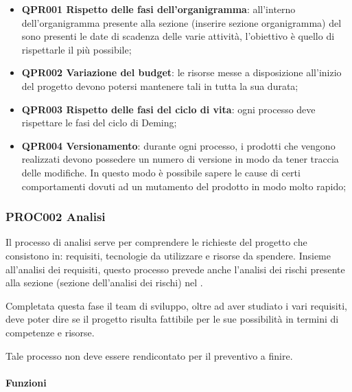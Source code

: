 		\begin{itemize}
			\item \textbf{QPR001 Rispetto delle fasi dell'organigramma}: all'interno dell'organigramma presente alla sezione (inserire sezione organigramma) del \Doc{\PdP} sono presenti le date di scadenza delle varie attività, l'obiettivo è quello di rispettarle il più possibile;
			\item \textbf{QPR002 Variazione del budget}: le risorse messe a disposizione all'inizio del progetto devono potersi mantenere tali in tutta la sua durata;
			\item \textbf{QPR003 Rispetto delle fasi del ciclo di vita}: ogni processo deve rispettare le fasi del ciclo di Deming;
			\item \textbf{QPR004 Versionamento}: durante ogni processo, i prodotti che vengono realizzati devono possedere un numero di versione in modo da tener traccia delle modifiche. In questo modo è possibile sapere le cause di certi comportamenti dovuti ad un mutamento del prodotto in modo molto rapido;  
		\end{itemize}
	
	\subsubsection{PROC002 Analisi}
	Il processo di analisi serve per comprendere le richieste del progetto che consistono in: requisiti, tecnologie da utilizzare e risorse da spendere. Insieme all'analisi dei requisiti, questo processo prevede anche l'analisi dei rischi presente alla sezione (sezione dell'analisi dei rischi) nel \Doc{\PdP}.
	
	Completata questa fase il team di sviluppo, oltre ad aver studiato i vari requisiti, deve poter dire se il progetto risulta fattibile per le sue possibilità in termini di competenze e risorse.
	
	Tale processo non deve essere rendicontato per il preventivo a finire.
	
		\paragraph*{Funzioni}
		
